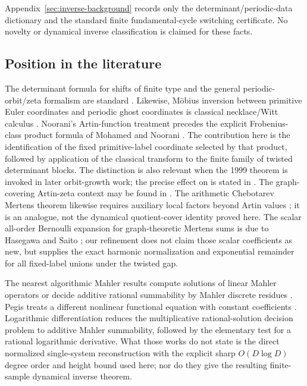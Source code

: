 Appendix~\ref{sec:inverse-background} records only the determinant/periodic-data
dictionary and the standard finite fundamental-cycle switching certificate.
No novelty or dynamical inverse classification is claimed for these facts.

\subsection{Position in the literature}

The determinant formula for shifts of finite type and the general
periodic-orbit/zeta formalism are standard
\cite{BowenLanford1970Zeta,Parry1983PrimeOrbit,ParryPollicott1990Zeta}.
Likewise, M\"obius inversion between primitive Euler coordinates and periodic
ghost coordinates is classical necklace/Witt calculus
\cite{MetropolisRota1983Necklaces}.  Noorani's Artin-function treatment
\cite{Noorani1995ChebotarevFiniteExtensions} precedes the explicit
Frobenius-class product formula of Mohamed and Noorani
\cite{MeslizaNoorani1999FrobeniusMertens}.  The contribution here is the
identification of the fixed primitive-label coordinate selected by that
product, followed by application of the classical transform to the finite
family of twisted determinant blocks.  The distinction is also relevant when
the 1999 theorem is invoked in later orbit-growth work; the precise effect on
\cite{NordinNooraniMohd2024OrbitGrowthSoficPFT} is stated in
.  The graph-covering Artin-zeta context may be
found in \cite{StarkTerras1996FiniteGraphsCoverings}.
The arithmetic Chebotarev Mertens theorem likewise requires auxiliary local
factors beyond Artin values
\cite{ArangoPinerosKeliherKeyes2022ChebotarevMertens}; it is an analogue, not
the dynamical quotient-cover identity proved here.
The scalar all-order Bernoulli expansion for graph-theoretic Mertens sums is
due to Hasegawa and Saito \cite{HasegawaSaito2016GraphMertens}; our refinement
does not claim those scalar coefficients as new, but supplies the exact
harmonic normalization and exponential remainder for all fixed-label unions
under the twisted gap.

The nearest algorithmic Mahler results compute solutions of linear Mahler
operators \cite{ChyzakDreyfusDumasMezzarobba2018MahlerSolutions} or decide
additive rational summability by Mahler discrete residues
\cite{ArrecheZhang2022MahlerResidues}.  Pegis treats a different nonlinear
functional equation with constant coefficients
\cite{Pegis1996NonlinearMahler}.  Logarithmic differentiation reduces the
multiplicative rational-solution decision problem to additive Mahler
summability, followed by the elementary test for a rational logarithmic
derivative.  What those works do not state is the direct normalized
single-system reconstruction with the explicit sharp \(O(D\log D)\) degree
order and height bound used here; nor do they give the resulting
finite-sample dynamical inverse theorem.

